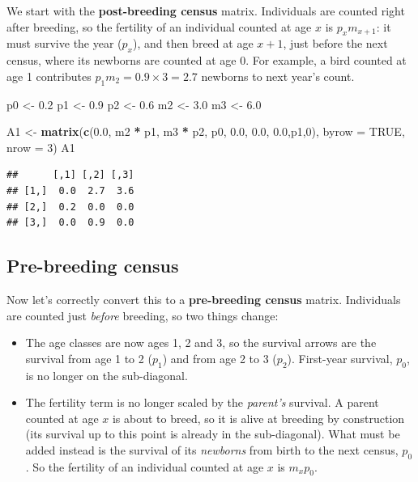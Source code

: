 \documentclass[
  a4paper]{book}
\newenvironment{Shaded}{\begin{snugshade}}{\end{snugshade}}
\newcommand{\AttributeTok}[1]{\textcolor[rgb]{0.13,0.29,0.53}{#1}}
\newcommand{\ConstantTok}[1]{\textcolor[rgb]{0.56,0.35,0.01}{#1}}
\newcommand{\DecValTok}[1]{\textcolor[rgb]{0.00,0.00,0.81}{#1}}
\newcommand{\FloatTok}[1]{\textcolor[rgb]{0.00,0.00,0.81}{#1}}
\newcommand{\FunctionTok}[1]{\textcolor[rgb]{0.13,0.29,0.53}{\textbf{#1}}}
\newcommand{\NormalTok}[1]{#1}
\newcommand{\OtherTok}[1]{\textcolor[rgb]{0.56,0.35,0.01}{#1}}
\newcommand{\SpecialCharTok}[1]{\textcolor[rgb]{0.81,0.36,0.00}{\textbf{#1}}}
\providecommand{\tightlist}{%
  \setlength{\itemsep}{0pt}\setlength{\parskip}{0pt}}
\begin{document}
We start with the \textbf{post-breeding census} matrix. Individuals are counted right after breeding, so the fertility of an individual counted at age \(x\) is \(p_x m_{x+1}\): it must survive the year (\(p_x\)), and then breed at age \(x+1\), just before the next census, where its newborns are counted at age 0. For example, a bird counted at age 1 contributes \(p_1 m_2 = 0.9 \times 3 = 2.7\) newborns to next year's count.

\begin{Shaded}
\begin{Highlighting}[]
\NormalTok{p0 }\OtherTok{\textless{}{-}} \FloatTok{0.2}
\NormalTok{p1 }\OtherTok{\textless{}{-}} \FloatTok{0.9}
\NormalTok{p2 }\OtherTok{\textless{}{-}} \FloatTok{0.6}
\NormalTok{m2 }\OtherTok{\textless{}{-}} \FloatTok{3.0}
\NormalTok{m3 }\OtherTok{\textless{}{-}} \FloatTok{6.0}

\NormalTok{A1 }\OtherTok{\textless{}{-}} \FunctionTok{matrix}\NormalTok{(}\FunctionTok{c}\NormalTok{(}\FloatTok{0.0}\NormalTok{, m2 }\SpecialCharTok{*}\NormalTok{ p1, m3 }\SpecialCharTok{*}\NormalTok{ p2,}
\NormalTok{               p0, }\FloatTok{0.0}\NormalTok{, }\FloatTok{0.0}\NormalTok{,}
               \FloatTok{0.0}\NormalTok{,p1,}\DecValTok{0}\NormalTok{), }\AttributeTok{byrow =} \ConstantTok{TRUE}\NormalTok{, }\AttributeTok{nrow =} \DecValTok{3}\NormalTok{)}
\NormalTok{A1}
\end{Highlighting}
\end{Shaded}

\begin{verbatim}
##      [,1] [,2] [,3]
## [1,]  0.0  2.7  3.6
## [2,]  0.2  0.0  0.0
## [3,]  0.0  0.9  0.0
\end{verbatim}

\subsection{Pre-breeding census}\label{pre-breeding-census}

Now let's correctly convert this to a \textbf{pre-breeding census} matrix. Individuals are counted just \emph{before} breeding, so two things change:

\begin{itemize}
\tightlist
\item
  The age classes are now ages 1, 2 and 3, so the survival arrows are the survival from age 1 to 2 (\(p_1\)) and from age 2 to 3 (\(p_2\)). First-year survival, \(p_0\), is no longer on the sub-diagonal.
\item
  The fertility term is no longer scaled by the \emph{parent's} survival. A parent counted at age \(x\) is about to breed, so it is alive at breeding by construction (its survival up to this point is already in the sub-diagonal). What must be added instead is the survival of its \emph{newborns} from birth to the next census, \(p_0\). So the fertility of an individual counted at age \(x\) is \(m_x p_0\).
\end{itemize}
\end{document}
